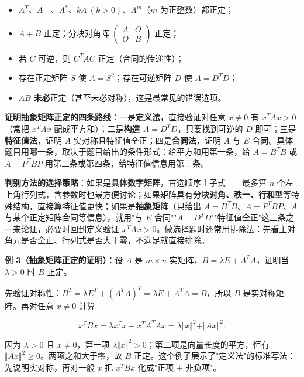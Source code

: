 \documentclass[11pt,openany,UTF8]{ctexbook}
\begin{document}
\begin{itemize}
\item $A^T$、$A^{-1}$、$A^*$、$kA\ (k>0)$、$A^m$（$m$ 为正整数）都正定；
\item $A+B$ 正定；分块对角阵 $\begin{pmatrix}A&O\\O&B\end{pmatrix}$ 正定；
\item 若 $C$ 可逆，则 $C^TAC$ 正定（合同的传递性）；
\item 存在正定矩阵 $S$ 使 $A=S^2$；存在可逆矩阵 $D$ 使 $A=D^TD$；
\item $AB$ \textbf{未必}正定（甚至未必对称），这是最常见的错误选项。
\end{itemize}
\textbf{证明抽象矩阵正定的四条路线}：一是\textbf{定义法}，直接验证对任意 $x\neq0$ 有 $x^TAx>0$（常把 $x^TAx$ 配成平方和）；二是\textbf{构造 $A=D^TD$}，只要找到可逆的 $D$ 即可；三是\textbf{特征值法}，证明 $A$ 实对称且特征值全正；四是\textbf{合同法}，证明 $A$ 与 $E$ 合同。具体题目用哪一条，取决于题目给出的条件形式：给平方和用第一条，给 $A=B^TB$ 或 $A=P^TBP$ 用第二条或第四条，给特征值信息用第三条。

\textbf{判别方法的选择策略}：如果是\textbf{具体数字矩阵}，首选顺序主子式——最多算 $n$ 个左上角行列式，含参数时也最方便讨论；如果矩阵具有\textbf{分块对角、秩一、行和型}等特殊结构，直接算特征值更快；如果是\textbf{抽象矩阵}（只给出 $A=B^TB$、$A=P^TBP$、$A$ 与某个正定矩阵合同等信息），就用"与 $E$ 合同""$A=D^TD$""特征值全正"这三条之一来论证，必要时回到定义验证 $x^TAx>0$。做选择题时还常用排除法：先看主对角元是否全正、行列式是否大于零，不满足就直接排除。

\textbf{例 3（抽象矩阵正定的证明）}：设 $A$ 是 $m\times n$ 实矩阵，$B=\lambda E+A^TA$，证明当 $\lambda>0$ 时 $B$ 正定。

先验证对称性：$B^T=\lambda E^T+(A^TA)^T=\lambda E+A^TA=B$，所以 $B$ 是实对称矩阵。再对任意 $x\neq0$ 计算

\[x^TBx=\lambda x^Tx+x^TA^TAx=\lambda\Vert x\Vert^2+\Vert Ax\Vert^2 .\]

因为 $\lambda>0$ 且 $x\neq0$，第一项 $\lambda\Vert x\Vert^2>0$；第二项是向量长度的平方，恒有 $\Vert Ax\Vert^2\geq0$。两项之和大于零，故 $B$ 正定。这个例子展示了"定义法"的标准写法：先说明实对称，再对一般 $x$ 把 $x^TBx$ 化成"正项 $+$ 非负项"。
\end{document}
